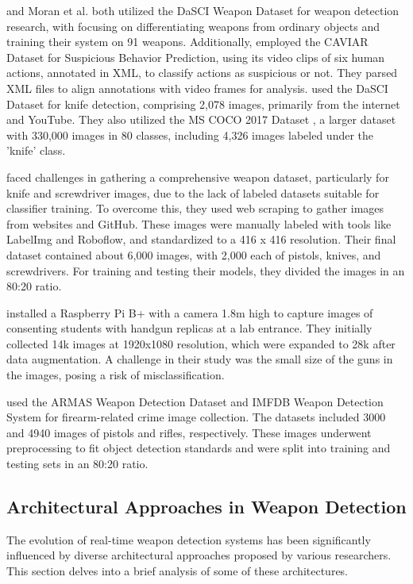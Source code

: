 \citet{rfc7} and Moran et al. \citet{rfc18} both utilized the DaSCI Weapon Dataset \cite{rfc29} for weapon detection research, with \citet{rfc7} focusing on differentiating weapons from ordinary objects and training their system on 91 weapons. Additionally, employed the CAVIAR Dataset \cite{rfc30} for Suspicious Behavior Prediction, using its video clips of six human actions, annotated in XML, to classify actions as suspicious or not. They parsed XML files to align annotations with video frames for analysis. \citet{rfc18} used the DaSCI Dataset \cite{rfc29} for knife detection, comprising 2,078 images, primarily from the internet and YouTube. They also utilized the MS COCO 2017 Dataset \cite{rfc16}, a larger dataset with 330,000 images in 80 classes, including 4,326 images labeled under the 'knife' class.

\citet{rfc17} faced challenges in gathering a comprehensive weapon dataset, particularly for knife and screwdriver images, due to the lack of labeled datasets suitable for classifier training. To overcome this, they used web scraping to gather images from websites and GitHub. These images were manually labeled with tools like LabelImg and Roboflow, and standardized to a 416 x 416 resolution. Their final dataset contained about 6,000 images, with 2,000 each of pistols, knives, and screwdrivers. For training and testing their models, they divided the images in an 80:20 ratio.

\citet{rfc19} installed a Raspberry Pi B+ with a camera 1.8m high to capture images of consenting students with handgun replicas at a lab entrance. They initially collected 14k images at 1920x1080 resolution, which were expanded to 28k after data augmentation. A challenge in their study was the small size of the guns in the images, posing a risk of misclassification.

\citet{rfc20} used the ARMAS Weapon Detection Dataset and IMFDB Weapon Detection System \cite{rfc28} for firearm-related crime image collection. The datasets included 3000 and 4940 images of pistols and rifles, respectively. These images underwent preprocessing to fit object detection standards and were split into training and testing sets in an 80:20 ratio.

\subsection{Architectural Approaches in Weapon Detection}
The evolution of real-time weapon detection systems has been significantly influenced by diverse architectural approaches proposed by various researchers. This section delves into a brief analysis of some of these architectures.

